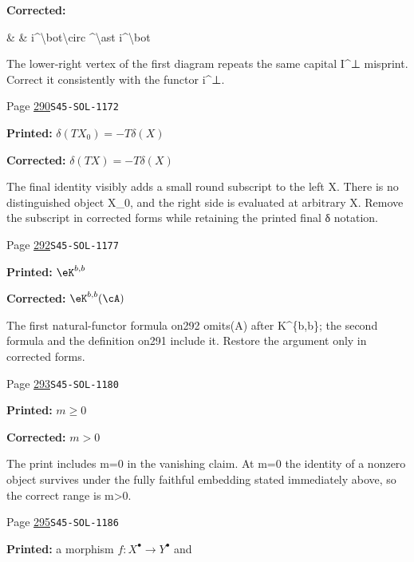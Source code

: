 \begin{description}
\par\noindent\textbf{Corrected:} {\footnotesize\ttfamily\raggedright \& \& i\textasciicircum{}\allowbreak{}\textbackslash{}\allowbreak{}bot\textbackslash{}\allowbreak{}circ \textasciicircum{}\allowbreak{}\textbackslash{}\allowbreak{}ast i\textasciicircum{}\allowbreak{}\textbackslash{}\allowbreak{}bot}
\par\noindent The lower-right vertex of the first diagram repeats the same capital I\textasciicircum{}⊥ misprint. Correct it consistently with the functor i\textasciicircum{}⊥.
\smallskip
\item[\hypertarget{apparatus:EN-0205}{205}] Page \hyperlink{printpage:en:290}{290}\quad\texttt{S45-SOL-1172}
\par\noindent\textbf{Printed:} \(\delta(TX_0)=-T\delta(X)\)
\par\noindent\textbf{Corrected:} \(\delta(TX)=-T\delta(X)\)
\par\noindent The final identity visibly adds a small round subscript to the left X. There is no distinguished object X\_0, and the right side is evaluated at arbitrary X. Remove the subscript in corrected forms while retaining the printed final δ notation.
\smallskip
\item[\hypertarget{apparatus:EN-0206}{206}] Page \hyperlink{printpage:en:292}{292}\quad\texttt{S45-SOL-1177}
\par\noindent\textbf{Printed:} \(\eK^{b,b}\)
\par\noindent\textbf{Corrected:} \(\eK^{b,b}(\cA)\)
\par\noindent The first natural-functor formula on292 omits(A) after K\textasciicircum{}\{b,b\}; the second formula and the definition on291 include it. Restore the argument only in corrected forms.
\smallskip
\item[\hypertarget{apparatus:EN-0207}{207}] Page \hyperlink{printpage:en:293}{293}\quad\texttt{S45-SOL-1180}
\par\noindent\textbf{Printed:} $m\geqslant 0$
\par\noindent\textbf{Corrected:} $m>0$
\par\noindent The print includes m=0 in the vanishing claim. At m=0 the identity of a nonzero object survives under the fully faithful embedding stated immediately above, so the correct range is m>0.
\smallskip
\item[\hypertarget{apparatus:EN-0208}{208}] Page \hyperlink{printpage:en:295}{295}\quad\texttt{S45-SOL-1186}
\par\noindent\textbf{Printed:} a morphism $f:X^\bullet \to Y^\bullet$ and

\end{description}
